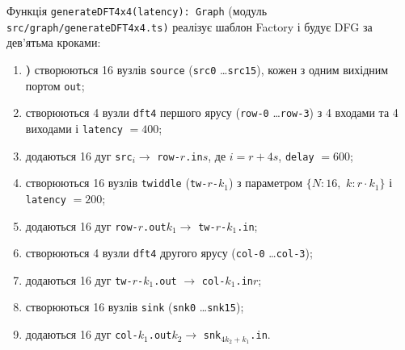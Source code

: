 \documentclass[
]{article}
\newcommand{\passthrough}[1]{#1}
\begin{document}
Функція
\passthrough{\lstinline!generateDFT!}\passthrough{\lstinline!4!}\passthrough{\lstinline!x!}\passthrough{\lstinline!4(!}\passthrough{\lstinline!latency!}\passthrough{\lstinline!):!}\passthrough{\lstinline! !}\passthrough{\lstinline!Graph!}
(модуль
\passthrough{\lstinline!src!}\passthrough{\lstinline!/!}\passthrough{\lstinline!graph!}\passthrough{\lstinline!/!}\passthrough{\lstinline!generateDFT!}\passthrough{\lstinline!4!}\passthrough{\lstinline!x!}\passthrough{\lstinline!4.!}\passthrough{\lstinline!ts!}\passthrough{\lstinline!)!}
реалізує шаблон Factory і будує DFG за дев'ятьма кроками:

\begin{enumerate}
\def\labelenumi{\arabic{enumi})}
\item
  \textbf{)} створюються 16 вузлів \passthrough{\lstinline!source!}
  (\passthrough{\lstinline!src!}\passthrough{\lstinline!0!}
  \ldots{}\passthrough{\lstinline!src!}\passthrough{\lstinline!15!}),
  кожен з одним вихідним портом \passthrough{\lstinline!out!};
\item
  створюються 4 вузли
  \passthrough{\lstinline!dft!}\passthrough{\lstinline!4!} першого ярусу
  (\passthrough{\lstinline!row!}\passthrough{\lstinline!-0!}
  \ldots{}\passthrough{\lstinline!row!}\passthrough{\lstinline!-3!}) з 4
  входами та 4 виходами і \passthrough{\lstinline!latency!} \(= 400\);
\item
  додаються 16 дуг \passthrough{\lstinline!src!}\(_{i} \rightarrow\)
  \passthrough{\lstinline!row-!}\(r\)\passthrough{\lstinline!.in!}\(s\),
  де \(i = r + 4s\), \passthrough{\lstinline!delay!} \(= 600\);
\item
  створюються 16 вузлів \passthrough{\lstinline!twiddle!}
  (\passthrough{\lstinline!tw!}\passthrough{\lstinline!-!}\(r\)\passthrough{\lstinline!-!}\(k_{1}\))
  з параметром \(\{ N:16,\mspace{6mu} k:r \cdot k_{1}\}\) і
  \passthrough{\lstinline!latency!} \(= 200\);
\item
  додаються 16 дуг
  \passthrough{\lstinline!row-!}\(r\)\passthrough{\lstinline!.out!}\(k_{1} \rightarrow\)
  \passthrough{\lstinline!tw!}\passthrough{\lstinline!-!}\(r\)\passthrough{\lstinline!-!}\(k_{1}\)\passthrough{\lstinline!.in!};
\item
  створюються 4 вузли
  \passthrough{\lstinline!dft!}\passthrough{\lstinline!4!} другого ярусу
  (\passthrough{\lstinline!col!}\passthrough{\lstinline!-0!}
  \ldots{}\passthrough{\lstinline!col!}\passthrough{\lstinline!-3!});
\item
  додаються 16 дуг
  \passthrough{\lstinline!tw!}\passthrough{\lstinline!-!}\(r\)\passthrough{\lstinline!-!}\(k_{1}\)\passthrough{\lstinline!.out!}
  \(\rightarrow\)
  \passthrough{\lstinline!col-!}\(k_{1}\)\passthrough{\lstinline!.in!}\(r\);
\item
  створюються 16 вузлів \passthrough{\lstinline!sink!}
  (\passthrough{\lstinline!snk!}\passthrough{\lstinline!0!}
  \ldots{}\passthrough{\lstinline!snk!}\passthrough{\lstinline!15!});
\item
  додаються 16 дуг
  \passthrough{\lstinline!col-!}\(k_{1}\)\passthrough{\lstinline!.out!}\(k_{2} \rightarrow\)
  \passthrough{\lstinline!snk!}\(_{4k_{2} + k_{1}}\)\passthrough{\lstinline!.in!}.
\end{enumerate}
\end{document}
